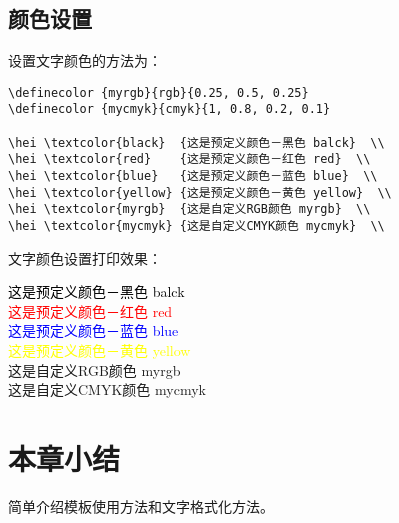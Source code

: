 \subsection{颜色设置}
设置文字颜色的方法为：
\begin{lstlisting}
\definecolor {myrgb}{rgb}{0.25, 0.5, 0.25}
\definecolor {mycmyk}{cmyk}{1, 0.8, 0.2, 0.1}

\hei \textcolor{black}  {这是预定义颜色－黑色 balck}  \\
\hei \textcolor{red}    {这是预定义颜色－红色 red}  \\
\hei \textcolor{blue}   {这是预定义颜色－蓝色 blue}  \\
\hei \textcolor{yellow} {这是预定义颜色－黄色 yellow}  \\
\hei \textcolor{myrgb}  {这是自定义RGB颜色 myrgb}  \\
\hei \textcolor{mycmyk} {这是自定义CMYK颜色 mycmyk}  \\
\end{lstlisting}


文字颜色设置打印效果：
\begin{flushleft}
\xiaosan
{

    \hei \textcolor{black}  {这是预定义颜色－黑色 balck}  \\
    \hei \textcolor{red}    {这是预定义颜色－红色 red}  \\
    \hei \textcolor{blue}   {这是预定义颜色－蓝色 blue}  \\
    \hei \textcolor{yellow} {这是预定义颜色－黄色 yellow}  \\
    \hei \textcolor{myrgb}  {这是自定义RGB颜色 myrgb}  \\
    \hei \textcolor{mycmyk} {这是自定义CMYK颜色 mycmyk}  \\
}
\end{flushleft}

\section*{本章小结}
简单介绍模板使用方法和文字格式化方法。
